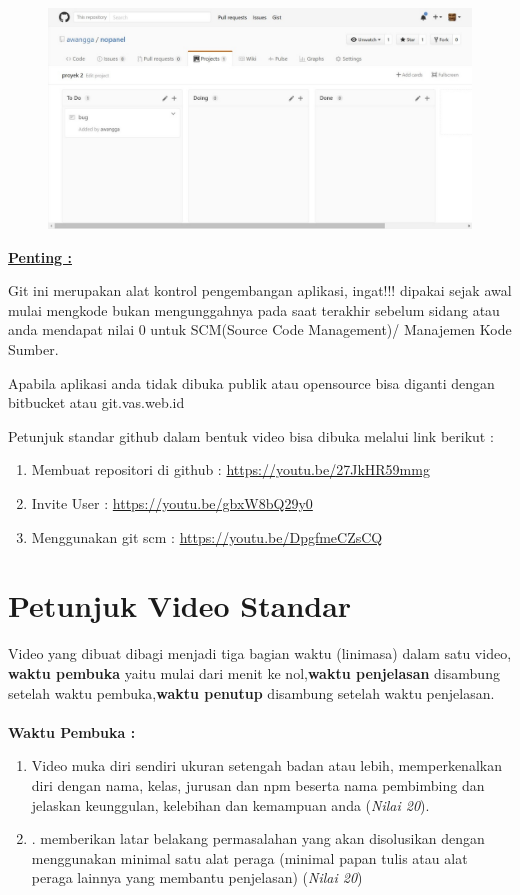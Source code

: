 \begin{figure}[H]
    \centering
    \includegraphics[scale=0.4]{figures/aad.jpg}
    \label{aasd}
\end{figure}

\textbf{\underline{Penting :}}\par
Git	ini	merupakan	alat	kontrol	pengembangan	aplikasi,	ingat!!!	dipakai	sejak	awal	mulai	mengkode	bukan	mengunggahnya	pada	saat	terakhir	sebelum	sidang	atau	anda	mendapat	nilai	0	
untuk	SCM(Source	Code	Management)/	Manajemen	Kode	Sumber.
\par 

Apabila	aplikasi	anda	tidak	dibuka	publik	atau	opensource	bisa	diganti	dengan	bitbucket	atau	
git.vas.web.id
\par 

Petunjuk	standar	github	dalam	bentuk	video	bisa	dibuka	melalui	link	berikut	:
\begin{enumerate}
\item Membuat	repositori	di	github	: \url{https://youtu.be/27JkHR59mmg}
\item Invite	User	: \url{https://youtu.be/gbxW8bQ29y0}
\item Menggunakan	git	scm	: \url{https://youtu.be/DpgfmeCZsCQ}
\end{enumerate}

\section{Petunjuk	Video	Standar}
Video	yang	dibuat	dibagi	menjadi	tiga	bagian	waktu	(linimasa)	dalam	satu	video, \textbf{waktu pembuka} yaitu	mulai	dari	menit	ke	nol,\textbf{waktu	penjelasan} disambung	setelah	waktu	pembuka,\textbf{waktu	penutup} disambung	setelah	waktu	penjelasan.
\\
\\
\textbf{Waktu Pembuka :}
\\
\begin{enumerate}
\item Video	muka	diri	sendiri	ukuran	setengah	badan	atau	lebih,	memperkenalkan	diri	dengan	nama,	kelas,	jurusan	dan	npm	beserta	nama	pembimbing	dan	jelaskan	keunggulan,	kelebihan	dan	kemampuan	anda (\textit{Nilai	20}).

\item . memberikan	latar	belakang	permasalahan	yang	akan	disolusikan	dengan	menggunakan	minimal	satu	alat	peraga	(minimal	papan	tulis	atau	alat	peraga	lainnya	yang	membantu	
penjelasan) (\textit{Nilai	20})
\end{enumerate}

